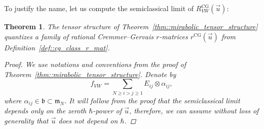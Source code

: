 \documentclass[10pt,a4paper]{amsart}
\numberwithin{equation}{section}
\newtheorem{Theorem}{Theorem}[section]
\newcommand{\CG}{\mathrm{CG}}
\renewcommand{\b}{\mathfrak{b}}
\newcommand{\m}{\mathfrak{m}}
\begin{document}
	To justify the name, let us compute the semiclassical limit of $R_{VW}^{\CG}(\vec{u})$:
	\begin{Theorem}
		\label{eq::cg_quantization}
		The tensor structure of Theorem~{\rm\ref{thm::mirabolic_tensor_structure}} quantizes a family of rational Cremmer--Gervais $r$-matrices $r^{\CG}(\vec{u})$ from Definition~{\rm\ref{def::cg_class_r_mat}}.
		\begin{proof}
			We use notations and conventions from the proof of Theorem~\ref{thm::mirabolic_tensor_structure}. Denote by
			\[
			f_{VW} = \sum\limits_{N \geq i > j \geq 1} E_{ij} \otimes \alpha_{ij},
			\]
			where $\alpha_{ij} \in \b \subset \m_N$. It will follow from the proof that the semiclassical limit depends only on the zeroth $\hbar$-power of $\vec{u}$, therefore, we can assume without loss of generality that $\vec{u}$ does not depend on $\hbar$.
			

\end{proof}
\end{Theorem}
\end{document}
